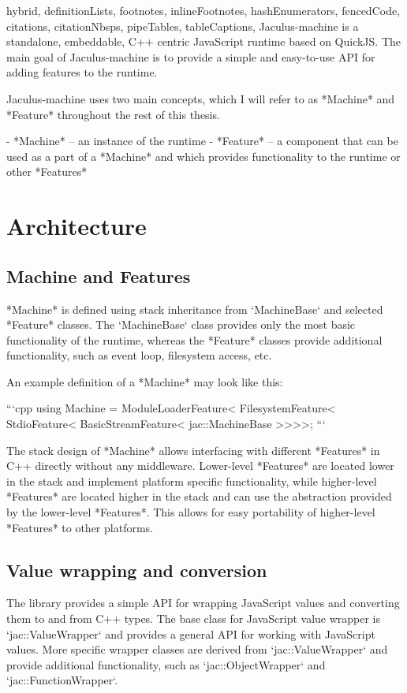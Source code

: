 \documentclass[
  digital,
  oneside,
  nosansbold,
  nocolorbold,
  lof,
  lot
]{fithesis4}
\begin{document}
\begin{markdown*}{%
  hybrid,
  definitionLists,
  footnotes,
  inlineFootnotes,
  hashEnumerators,
  fencedCode,
  citations,
  citationNbsps,
  pipeTables,
  tableCaptions,
}
Jaculus-machine is a standalone, embeddable, C++ centric JavaScript runtime based on QuickJS. The main goal of Jaculus-machine is to provide a simple and easy-to-use API for adding features to the runtime.

Jaculus-machine uses two main concepts, which I will refer to as *Machine* and *Feature* throughout the rest of this thesis.

  - *Machine* -- an instance of the runtime
  - *Feature* -- a component that can be used as a part of a *Machine* and which provides functionality to the runtime or other *Features*

\section{Architecture}

\subsection{Machine and Features}

*Machine* is defined using stack inheritance from `MachineBase` and selected *Feature* classes. The `MachineBase` class provides only the most basic functionality of the runtime, whereas the *Feature* classes provide additional functionality, such as event loop, filesystem access, etc.

An example definition of a *Machine* may look like this:

```cpp
using Machine =
    ModuleLoaderFeature<
    FilesystemFeature<
    StdioFeature<
    BasicStreamFeature<
    jac::MachineBase
>>>>;
```

The stack design of *Machine* allows interfacing with different *Features* in C++ directly without any middleware. Lower-level *Features* are located lower in the stack and implement platform specific functionality, while higher-level *Features* are located higher in the stack and can use the abstraction provided by the lower-level *Features*. This allows for easy portability of higher-level *Features* to other platforms.

\subsection{Value wrapping and conversion}

The library provides a simple API for wrapping JavaScript values and converting them to and from C++ types. The base class for JavaScript value wrapper is `jac::ValueWrapper` and provides a general API for working with JavaScript values. More specific wrapper classes are derived from `jac::ValueWrapper` and provide additional functionality, such as `jac::ObjectWrapper` and `jac::FunctionWrapper`.


\end{markdown*}
\end{document}
